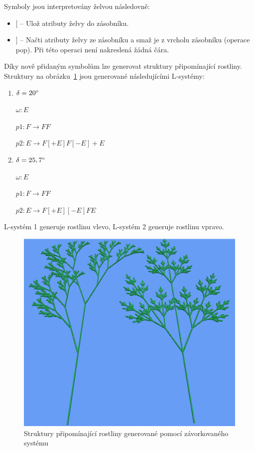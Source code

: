 \documentclass[thesis=M,czech]{FITthesis}[2019/12/23]
\begin{document}
Symboly jsou interpretovány želvou následovně:

\begin{itemize}
\item $[$ -- Ulož atributy želvy do zásobníku.
\item $]$ -- Načti atributy želvy ze zásobníku a smaž je z vrcholu zásobníku (operace pop). Při této operaci není nakreslená žádná čára.
\end{itemize}

Díky nově přidaným symbolům lze generovat struktury připomínající rostliny. Struktury na obrázku~\ref{fig:plant_like_str} jsou generované následujícími L-systémy:

\begin{enumerate}
\item $\delta = 20\degree$

	$\omega: E$
	
	$p1: F \rightarrow FF$
	
	$p2: E \rightarrow F[+E]F[-E]+E$
	
\item $\delta = 25,7\degree$

	$\omega: E$
	
	$p1: F \rightarrow FF$
	
	$p2: E \rightarrow F[+E][-E]FE$

\end{enumerate}

L-systém 1 generuje rostlinu vlevo, L-systém 2 generuje rostlinu vpravo.

\begin{figure}\centering
	\includegraphics[width=\textwidth]{images/plant_d_e}
	\caption[Struktury připomínající rostliny]{Struktury připomínající rostliny generované pomocí závorkovaného systému}\label{fig:plant_like_str}
\end{figure}
\end{document}
